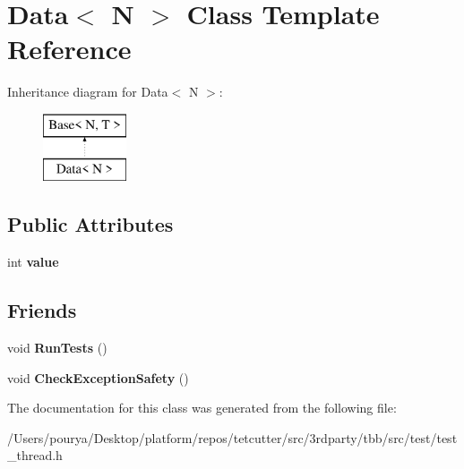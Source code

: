 \hypertarget{classData}{}\section{Data$<$ N $>$ Class Template Reference}
\label{classData}
Inheritance diagram for Data$<$ N $>$\+:\begin{figure}[H]
\begin{center}
\leavevmode
\includegraphics[height=2.000000cm]{classData}
\end{center}
\end{figure}
\subsection*{Public Attributes}
\begin{DoxyCompactItemize}
\item 
\hypertarget{classData_a61b98d931abf999426aff1afb53d82e1}{}int {\bfseries value}\label{classData_a61b98d931abf999426aff1afb53d82e1}

\end{DoxyCompactItemize}
\subsection*{Friends}
\begin{DoxyCompactItemize}
\item 
\hypertarget{classData_a42dac6ca34e006a4c6eccfd7842df376}{}void {\bfseries Run\+Tests} ()\label{classData_a42dac6ca34e006a4c6eccfd7842df376}

\item 
\hypertarget{classData_a84f9141e5aecc728d8445144965aeb7c}{}void {\bfseries Check\+Exception\+Safety} ()\label{classData_a84f9141e5aecc728d8445144965aeb7c}

\end{DoxyCompactItemize}


The documentation for this class was generated from the following file\+:\begin{DoxyCompactItemize}
\item 
/\+Users/pourya/\+Desktop/platform/repos/tetcutter/src/3rdparty/tbb/src/test/test\+\_\+thread.\+h\end{DoxyCompactItemize}
